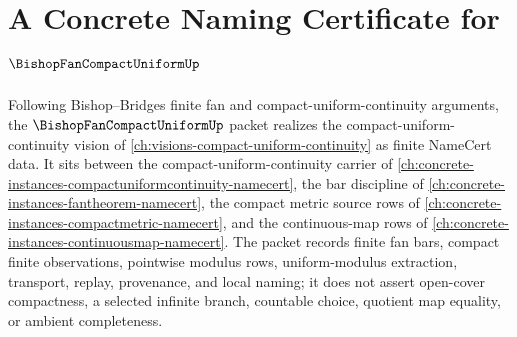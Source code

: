 \chapter{A Concrete Naming Certificate for $\BishopFanCompactUniformUp$}
\label{ch:concrete-instances-compact-uniform-bishop-fan-namecert}

Following Bishop--Bridges finite fan and compact-uniform-continuity arguments, the $\BishopFanCompactUniformUp$ packet realizes the compact-uniform-continuity vision of \autoref{ch:visions-compact-uniform-continuity} as finite NameCert data. It sits between the compact-uniform-continuity carrier of \autoref{ch:concrete-instances-compactuniformcontinuity-namecert}, the bar discipline of \autoref{ch:concrete-instances-fantheorem-namecert}, the compact metric source rows of \autoref{ch:concrete-instances-compactmetric-namecert}, and the continuous-map rows of \autoref{ch:concrete-instances-continuousmap-namecert}. The packet records finite fan bars, compact finite observations, pointwise modulus rows, uniform-modulus extraction, transport, replay, provenance, and local naming; it does not assert open-cover compactness, a selected infinite branch, countable choice, quotient map equality, or ambient completeness.

